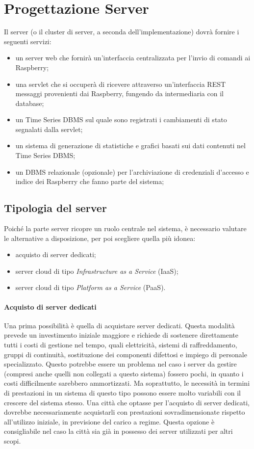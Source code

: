 \section{Progettazione Server}
Il server (o il cluster di server, a seconda dell'implementazione) dovrà fornire i seguenti servizi:
\begin{itemize}
 \item un server web che fornirà un'interfaccia centralizzata per l'invio di comandi ai Raspberry;
 \item una servlet che si occuperà di ricevere attraverso un'interfaccia REST messaggi provenienti dai Raspberry, fungendo da intermediaria con il database;
 \item un Time Series DBMS sul quale sono registrati i cambiamenti di stato segnalati dalla servlet;
 \item un sistema di generazione di statistiche e grafici basati sui dati contenuti nel Time Series DBMS;
 \item un DBMS relazionale (opzionale) per l'archiviazione di credenziali d'accesso e indice dei Raspberry che fanno parte del sistema;
\end{itemize}

\subsection{Tipologia del server}
Poiché la parte server ricopre un ruolo centrale nel sistema, è necessario valutare le alternative a disposizione, per poi scegliere quella più idonea:
\begin{itemize}
 \item acquisto di server dedicati;
 \item server cloud di tipo \textit{Infrastructure as a Service} (IaaS);
 \item server cloud di tipo \textit{Platform as a Service} (PaaS).
\end{itemize}
\paragraph{Acquisto di server dedicati}
Una prima possibilità è quella di acquistare server dedicati.
Questa modalità prevede un investimento iniziale maggiore e richiede di sostenere direttamente tutti i costi di gestione nel tempo, quali elettricità, sistemi di raffreddamento, gruppi di continuità, sostituzione dei componenti difettosi e impiego di personale specializzato.
Questo potrebbe essere un problema nel caso i server da gestire (compresi anche quelli non collegati a questo sistema) fossero pochi, in quanto i costi difficilmente sarebbero ammortizzati.
Ma soprattutto, le necessità in termini di prestazioni in un sistema di questo tipo possono essere molto variabili con il crescere del sistema stesso.
Una città che optasse per l'acquisto di server dedicati, dovrebbe necessariamente acquistarli con prestazioni sovradimensionate rispetto all'utilizzo iniziale, in previsione del carico a regime.
Questa opzione è consigliabile nel caso la città sia già in possesso dei server utilizzati per altri scopi.
